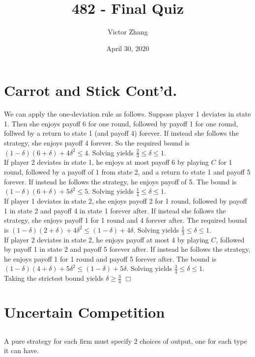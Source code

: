 \documentclass{article}
\title{482 - Final Quiz}
\author{Victor Zhang}
\date{April 30, 2020}
\begin{document}
\maketitle

\section{Carrot and Stick Cont'd.}
We can apply the one-deviation rule as follows. Suppose player 1 deviates in state 1. Then she enjoys payoff 6 for one round, followed by payoff 1 for one round, follwed by a return to state 1 (and payoff 4) forever. If instead she follows the strategy, she enjoys payoff 4 forever. So the required bound is $(1-\delta)(6+\delta) + 4\delta^2 \leq 4$. Solving yields $\frac{2}{3} \leq \delta \leq 1$.\\
If player 2 deviates in state 1, he enjoys at most payoff 6 by playing $C$ for 1 round, followed by a payoff of 1 from state 2, and a return to state 1 and payoff 5 forever. If instead he follows the strategy, he enjoys payoff of 5. The bound is $(1-\delta)(6+\delta) + 5\delta^2 \leq 5$. Solving yields $\frac{1}{4} \leq \delta \leq 1$.\\
If player 1 deviates in state 2, she enjoys payoff 2 for 1 round, followed by payoff 1 in state 2 and payoff 4 in state 1 forever after. If instead she follows the strategy, she enjoys payoff 1 for 1 round and 4 forever after. The required bound is $(1-\delta)(2+\delta) + 4\delta^2 \leq (1-\delta) + 4\delta$. Solving yields $\frac{1}{3} \leq \delta \leq 1$.\\
If player 2 deviates in state 2, he enjoys payoff at most 4 by playing $C$, followed by payoff 1 in state 2 and payoff 5 forever after. If instead he follows the strategy, he enjoys payoff 1 for 1 round and payoff 5 forever after. The bound is $(1-\delta)(4+\delta) + 5\delta^2 \leq (1-\delta) + 5\delta$. Solving yields $\frac{3}{4} \leq \delta \leq 1$.\\
Taking the strictest bound yields $\delta \geq \frac{3}{4}$ $\Box$

\section{Uncertain Competition}
\subsection{}
A pure strategy for each firm must specify 2 choices of output, one for each type it can have.
\end{document}
